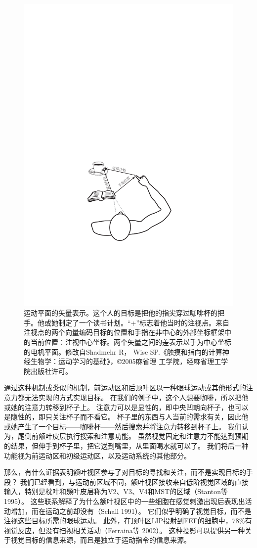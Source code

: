 \begin{figure}
	\centering
	\includegraphics[width=0.7\linewidth]{image_pfc/Fig_5_3}
	\caption{运动平面的矢量表示。这个人的目标是把他的指尖穿过咖啡杯的把手。他或她制定了一个读书计划。“+”标志着他当时的注视点。来自注视点的两个向量编码目标的位置和手指在非中心的外部坐标框架中的当前位置：注视中心坐标。两个矢量之间的差表示以手为中心坐标的电机平面。修改自Shadmehr R， Wise SP.《触摸和指向的计算神经生物学：运动学习的基础》，©2005麻省理 工学院，经麻省理工学院出版社许可。}
	\label{fig:fig}
\end{figure}


通过这种机制或类似的机制，前运动区和后顶叶区以一种眼球运动或其他形式的注意力都无法实现的方式实现目标。
在我们的例子中，这个人想要咖啡，所以把他或她的注意力转移到杯子上。
注意力可以是显性的，即中央凹朝向杯子，也可以是隐性的，即只关注杯子而不看它。
杯子里的东西与人当前的需求有关，因此他或她产生了一个目标——咖啡杯——然后搜索并将注意力转移到杯子上。
我们认为，尾侧前额叶皮层执行搜索和注意功能。
虽然视觉固定和注意力不能达到预期的结果，但伸手到杯子里，把它送到嘴里，从里面喝水就可以了。
我们将后一种功能视为前运动区和初级运动区，以及运动系统的其他部分。


那么，有什么证据表明额叶视区参与了对目标的寻找和关注，而不是实现目标的手段？
我们已经看到，与运动前区域不同，额叶视区接收来自低阶视觉区域的直接输入，特别是枕叶和颞叶皮层称为V2、V3、V4和MST的区域（Stanton等 1995）。
这些联系解释了为什么额叶视区中的一些细胞在感觉刺激出现后表现出活动增加，而在运动之前却没有（Schall 1991）。
它们似乎明确了视觉目标，而不是注视这些目标所需的眼球运动。
此外，在顶叶区LIP投射到FEF的细胞中，78\%有视觉反应，但没有扫视相关活动（Ferraina等 2002）。
这种投影可以提供另一种关于视觉目标的信息来源，而且是独立于运动指令的信息来源。


